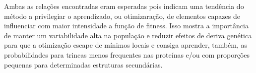 Ambas as relações encontradas eram esperadas pois indicam uma tendência do método a privilegiar o aprendizado, ou otimizaração, de elementos capazes de influenciar com maior intensidade a função de fitness. Isso mostra a importância de manter um variabilidade alta na população e reduzir efeitos de deriva genética para que a otimização escape de mínimos locais e consiga aprender, também, as probabilidades para trincas menos frequentes nas proteínas e/ou com proporções pequenas para determinadas estruturas secundárias.





